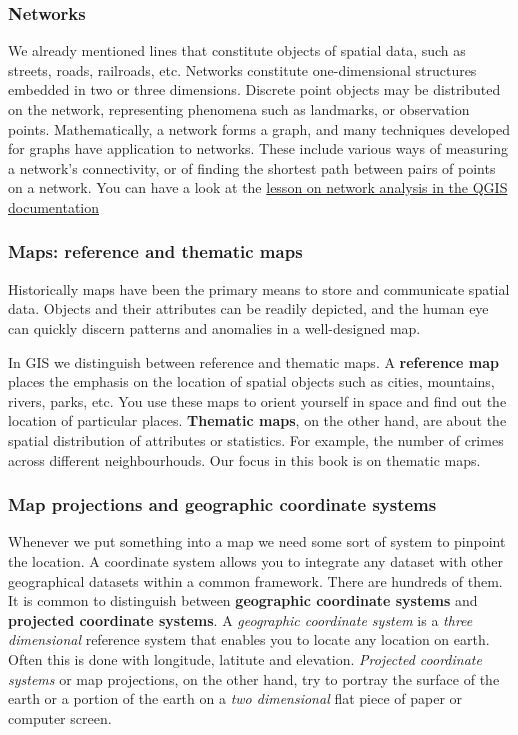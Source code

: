 \documentclass[
]{book}
\begin{document}
\hypertarget{networks}{%
\subsubsection{Networks}\label{networks}}

We already mentioned lines that constitute objects of spatial data, such as streets, roads, railroads, etc. Networks constitute one-dimensional structures embedded in two or three dimensions. Discrete point objects may be distributed on the network, representing phenomena such as landmarks, or observation points. Mathematically, a network forms a graph, and many techniques developed for graphs have application to networks. These include various ways of measuring a network's connectivity, or of finding the shortest path between pairs of points on a network. You can have a look at the \href{https://docs.qgis.org/2.18/en/docs/training_manual/vector_analysis/network_analysis.html}{lesson on network analysis in the QGIS documentation}

\hypertarget{maps-reference-and-thematic-maps}{%
\subsubsection{Maps: reference and thematic maps}\label{maps-reference-and-thematic-maps}}

Historically maps have been the primary means to store and communicate spatial data. Objects and their attributes can be readily depicted, and the human eye can quickly discern patterns and anomalies in a well-designed map.

In GIS we distinguish between reference and thematic maps. A \textbf{reference map} places the emphasis on the location of spatial objects such as cities, mountains, rivers, parks, etc. You use these maps to orient yourself in space and find out the location of particular places. \textbf{Thematic maps}, on the other hand, are about the spatial distribution of attributes or statistics. For example, the number of crimes across different neighbourhouds. Our focus in this book is on thematic maps.

\hypertarget{map-projections-and-geographic-coordinate-systems}{%
\subsubsection{Map projections and geographic coordinate systems}\label{map-projections-and-geographic-coordinate-systems}}

Whenever we put something into a map we need some sort of system to pinpoint the location. A coordinate system allows you to integrate any dataset with other geographical datasets within a common framework. There are hundreds of them. It is common to distinguish between \textbf{geographic coordinate systems} and \textbf{projected coordinate systems}. A \emph{geographic coordinate system} is a \emph{three dimensional} reference system that enables you to locate any location on earth. Often this is done with longitude, latitute and elevation. \emph{Projected coordinate systems} or map projections, on the other hand, try to portray the surface of the earth or a portion of the earth on a \emph{two dimensional} flat piece of paper or computer screen.
\end{document}
